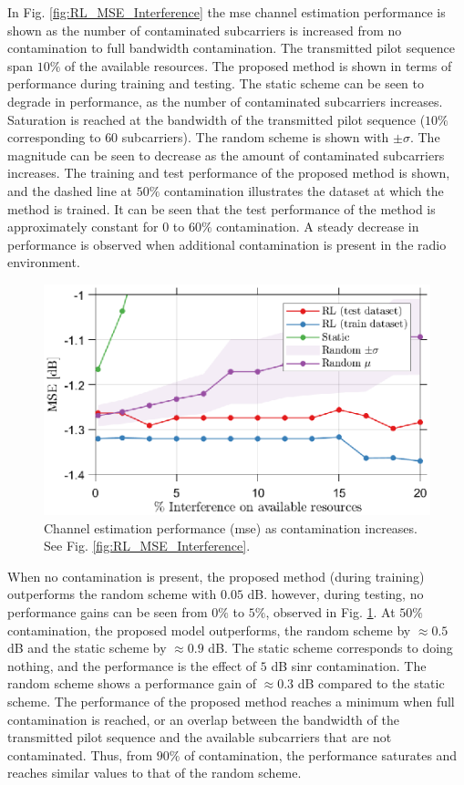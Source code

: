 In Fig. \ref{fig:RL_MSE_Interference} the \gls{mse} channel estimation performance is shown as the number of contaminated subcarriers is increased from no contamination to full bandwidth contamination. The transmitted pilot sequence span $10\%$ of the available resources. The proposed method is shown in terms of performance during training and testing. The static scheme can be seen to degrade in performance, as the number of contaminated subcarriers increases. Saturation is reached at the bandwidth of the transmitted pilot sequence ($10\%$ corresponding to $60$ subcarriers). The random scheme is shown with $\pm \sigma$. The magnitude can be seen to decrease as the amount of contaminated subcarriers increases. The training and test performance of the proposed method is shown, and the dashed line at $50\%$ contamination illustrates the dataset at which the method is trained. It can be seen that the test performance of the method is approximately constant for $0$ to $60\%$ contamination. A steady decrease in performance is observed when additional contamination is present in the radio environment. 
\begin{figure}
    \centering
    \includegraphics{chapters/part_uplink/figures/results/MSE_Interference_zoomedin.eps}
    \caption{Channel estimation performance (\gls{mse}) as contamination increases. See Fig. \ref{fig:RL_MSE_Interference}.}
    \label{fig:RL_MSE_Interference_zoomedin}
\end{figure}


When no contamination is present, the proposed method (during training) outperforms the random scheme with $0.05$ dB. however, during testing, no performance gains can be seen from $0\%$ to $5\%$, observed in Fig. \ref{fig:RL_MSE_Interference_zoomedin}. 
At $50\%$ contamination, the proposed model outperforms, the random scheme by $\approx 0.5$ dB and the static scheme by $\approx 0.9$ dB. The static scheme corresponds to doing nothing, and the performance is the effect of $5$ dB \gls{sinr} contamination. The random scheme shows a performance gain of $\approx 0.3$ dB compared to the static scheme. The performance of the proposed method reaches a minimum when full contamination is reached, or an overlap between the bandwidth of the transmitted pilot sequence and the available subcarriers that are not contaminated. Thus, from $90\%$ of contamination, the performance saturates and reaches similar values to that of the random scheme. 

